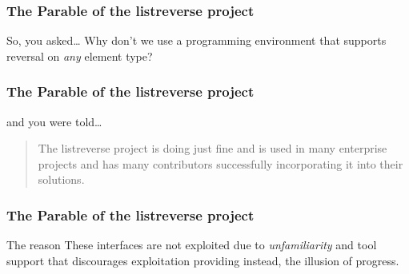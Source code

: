\begin{frame}
\frametitle{The Parable of the listreverse project}
\begin{block}{So, you asked\ldots}
Why don't we use a programming environment that supports reversal on \emph{any} element type?
\end{block}
\end{frame}

\begin{frame}
\frametitle{The Parable of the listreverse project}
\begin{block}{and you were told\ldots}
\begin{quote}
The listreverse project is doing just fine and is used in many enterprise projects and has many contributors successfully incorporating it into their solutions.
\end{quote}
\end{block}
\end{frame}

\begin{frame}
\frametitle{The Parable of the listreverse project}
\begin{block}{The reason}
These interfaces are not exploited due to \emph{unfamiliarity} and tool support that discourages exploitation providing instead, the illusion of progress.
\end{block}
\end{frame}






